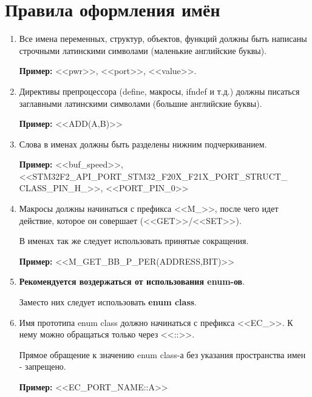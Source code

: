 \section{Правила оформления имён}\label{general:rules:0}
\begin{enumerate}
	\item Все имена переменных, структур, объектов, функций должны быть написаны строчными латинскими символами (маленькие английские буквы).
	
	\textbf{Пример: }<<pwr>>, <<port>>, <<value>>.
	\item Директивы препроцессора (define, макросы, ifndef и т.д.) должны писаться заглавными латинскими символами (большие английские буквы). 
	
	\textbf{Пример: }<<ADD(A,B)>>
	\item Слова в именах должны быть разделены нижним подчеркиванием.
	
	\textbf{Пример: }<<buf\_speed>>, <<STM32F2\-\_API\-\_PORT\-\_STM32\-\_F20X\-\_F21X\-\_PORT\-\_STRUCT\-\_\\CLASS\_PIN\-\_H\_>>, <<PORT\_PIN\_0>>
	\item Макросы должны начинаться с префикса <<M\_>>, после чего идет действие, которое он совершает (<<GET>>/<<SET>>).
	
	В именах так же следует использовать принятые сокращения.
	
	\textbf{Пример: }<<M\_GET\_BB\_P\_PER(ADDRESS,BIT)>>
	\item \textbf{Рекомендуется воздержаться от использования enum-ов}.
	
	Заместо них следует использовать \textbf{enum class}.
	\item Имя прототипа enum class должно начинаться с префикса <<EC\_>>. К нему можно обращаться только через <<::>>.
	
	Прямое обращение к значению enum class-а без указания пространства имен - запрещено.
	
	\textbf{Пример: }<<EC\_PORT\_NAME::A>>
\end{enumerate}
